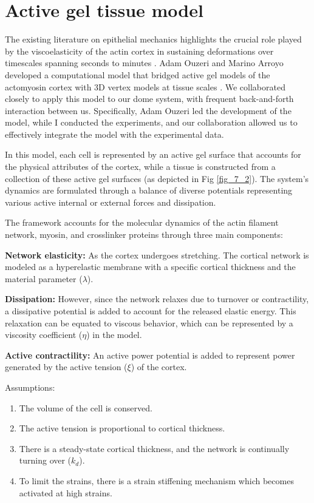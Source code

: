 \hypertarget{active-gel-tissue-model}{%
	\section{Active gel tissue model}\label{active-gel-tissue-model}}


The existing literature on epithelial mechanics highlights the crucial role played by the viscoelasticity of the actin cortex in sustaining deformations over timescales spanning seconds to minutes \cite{kelkar2020,clement2017,khalilgharibi2019}. Adam Ouzeri and Marino Arroyo developed a computational model that bridged active gel models of the actomyosin cortex with 3D vertex models at tissue scales \cite{ouzeri2023}. We collaborated closely to apply this model to our dome system, with frequent back-and-forth interaction between us. Specifically, Adam Ouzeri led the development of the model, while I conducted the experiments, and our collaboration allowed us to effectively integrate the model with the experimental data. 

In this model, each cell is represented by an active gel surface that accounts for the physical attributes of the cortex, while a tissue is constructed from a collection of these active gel surfaces (as depicted in Fig \ref{fig_7_2}). The system's dynamics are formulated through a balance of diverse potentials representing various active internal or external forces and dissipation.

The framework accounts for the molecular dynamics of the actin filament network, myosin, and crosslinker proteins through three main components:

\textbf{Network elasticity:} As the cortex undergoes stretching. The cortical network is modeled as a hyperelastic membrane with a specific cortical thickness and the material parameter ($\lambda$).

\textbf{Dissipation:} However, since the network relaxes due to turnover or contractility, a dissipative potential is added to account for the released elastic energy. This relaxation can be equated to viscous behavior, which can be represented by a viscosity coefficient ($\eta$) in the model. 

\textbf{Active contractility:} An active power potential is added to represent power generated by the active tension ($\xi$) of the cortex. 

Assumptions: 
\begin{enumerate}
	  \setlength\itemsep{-0.1em}
	\item The volume of the cell is conserved.
	\item The active tension is proportional to cortical thickness.
	\item There is a steady-state cortical thickness, and the network is continually turning over ($k_d$).
	\item To limit the strains, there is a strain stiffening mechanism which becomes activated at high strains.		
\end{enumerate}


